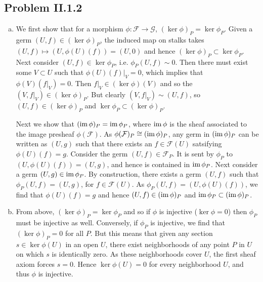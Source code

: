 \documentclass{mathnotes}
\begin{document}
\subsection*{Problem II.1.2}
\begin{enumerate}[(a)]
    \item We first show that for a morphism $\phi:\mathcal{F}\to\mathcal{G}$, $(\ker\phi)_P=\ker\phi_P$.
        Given a germ $(U,f)\in(\ker\phi)_P$, the induced map on stalks takes $(U,f)\mapsto (U,\phi(U)(f))=(U,0)$
        and hence $(\ker\phi)_P\subset\ker\phi_P$. Next consider $(U,f)\in\ker\phi_P$, i.e. $\phi_P(U,f)\sim0$.
        Then there must exist some $V\subset U$ such that $\phi(U)(f)|_V=0$, which implies that $\phi(V)(f|_V)=0$.
        Then $f|_V\in(\ker\phi)(V)$ and so the $(V,f|_V)\in(\ker\phi)_P$. But clearly $(V,f|_V)\sim(U,f)$, so
        $(U,f)\in(\ker\phi)_P$ and $\ker\phi_P\subset(\ker\phi)_P$.
        
        Next we show that $(\operatorname{im}\phi)_P=\operatorname{im}\phi_P$, where $\operatorname{im}\phi$ is the sheaf associated to the image presheaf
        $\phi(\mathcal{F})$. As $\phi(\mathcal{F})_P\cong(\operatorname{im}\phi)_P$, any germ in $(\operatorname{im}\phi)_P$ can be written
        as $(U,g)$ such that there exists an $f\in\mathcal{F}(U)$ satsifying $\phi(U)(f)=g$. Consider the germ
        $(U,f)\in\mathcal{F}_P$. It is sent by $\phi_P$ to $(U,\phi(U)(f))=(U,g)$, and hence is contained in $\operatorname{im}\phi_P$.
        Next consider a germ $(U,g)\in\operatorname{im}\phi_P$. By construction, there exists a germ $(U,f)$ such that $\phi_P(U,f)=(U,g)$,
        for $f\in\mathcal{F}(U)$. As $\phi_P(U,f)=(U,\phi(U)(f))$, we find that $\phi(U)(f)=g$ and hence $(U,f)\in(\operatorname{im}\phi)_P$
        and $\operatorname{im}\phi_P\subset(\operatorname{im} \phi)_P$.
    \item From above, $(\ker\phi)_P=\ker\phi_P$ and so if $\phi$ is injective ($\ker\phi=0$) then $\phi_P$ must be injective
        as well. Conversely, if $\phi_P$ is injective, we find that $(\ker\phi)_P=0$ for all $P$. But this means that
        given any section $s\in\ker\phi(U)$ in an open $U$, there exist neighborhoods of any point $P$ in $U$ on which
        $s$ is identically zero. As these neighborhoods cover $U$, the first sheaf axiom forces $s=0$. Hence $\ker\phi(U)=0$
        for every neighborhood $U$, and thus $\phi$ is injective.


\end{enumerate}
\end{document}
